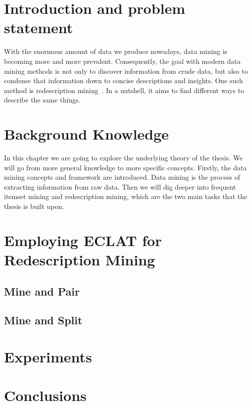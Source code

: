\chapter{Introduction and problem statement}
\label{cha:intro}
With the enormous amount of data we produce nowadays, data mining is becoming more and more prevalent.
Consequently, the goal with modern data mining methods is not only to discover information from crude data, but also to condense that information down to concise descriptions and insights.
One such method is redescription mining~\citep{ramakrishnan_turning_2004}.
In a nutshell, it aims to find different ways to describe the same things.

\chapter{Background Knowledge}
\label{cha:background}
In this chapter we are going to explore the underlying theory of the thesis.
We will go from more general knowledge to more specific concepts.
Firstly, the data mining concepts and framework are introduced.
Data mining is the process of extracting information from raw data.
Then we will dig deeper into frequent itemset mining and redescription mining, which are the two main tasks that the thesis is built upon.







\chapter{Employing ECLAT for Redescription Mining}
\label{cha:employment}
\section{Mine and Pair}
\section{Mine and Split}

\chapter{Experiments}
\label{cha:experiments}

\chapter{Conclusions}
\label{cha:conclusions}